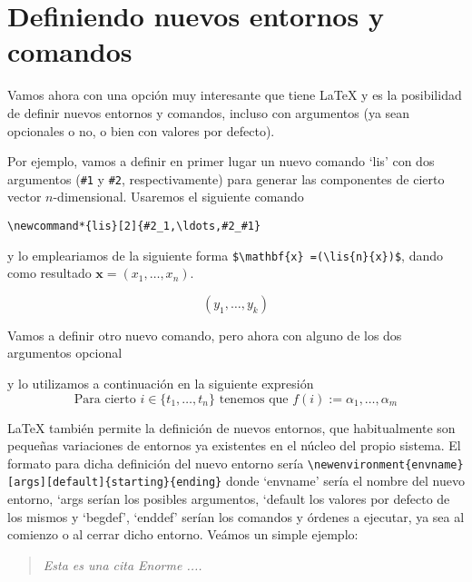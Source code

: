 \documentclass[11pt]{article}
\begin{document}
\section{Definiendo nuevos entornos y comandos}

Vamos ahora con una opción muy interesante que tiene {\LaTeX} y es la posibilidad de definir nuevos  entornos y comandos, incluso con argumentos (ya sean opcionales o no, o bien con valores por defecto).

Por ejemplo, vamos a definir en primer lugar un nuevo comando `lis' con dos argumentos (\verb|#1| y \verb|#2|, respectivamente) para generar las componentes de cierto vector $n$-dimensional. Usaremos el siguiente comando

\verb|\newcommand*{lis}[2]{#2_1,\ldots,#2_#1}| 
\newcommand{\lis}[2]{#2_1,\ldots,#2_#1}

\noindent y lo empleariamos de la siguiente forma  \verb|$\mathbf{x} =(\lis{n}{x})$|, dando como resultado 
$\mathbf{x} = (\lis{n}{x})$.

$$(\lis{k}{y})$$

Vamos a definir otro nuevo comando, pero ahora con alguno de los dos argumentos opcional

\newcommand{\seq}[2][n]{#2_1,\ldots,#2_#1}

y lo utilizamos a continuación en la siguiente expresión 
$$
\mbox{Para cierto  } i\in \{ \seq{t}  \}  
\text{ tenemos que  } f(i):= \seq[m]{\alpha} 
$$ 

{\LaTeX} también permite la definición de nuevos entornos, que habitualmente son pequeñas variaciones de entornos ya existentes en el núcleo del propio sistema. El formato para dicha definición del nuevo entorno sería
\verb|\newenvironment{envname}[args][default]{starting}{ending}| donde 
`envname' sería el nombre del nuevo entorno, `args serían los posibles argumentos, `default los valores por defecto de los mismos y `begdef',  `enddef' serían los comandos y órdenes a ejecutar, ya sea al comienzo o al cerrar dicho entorno. Veámos un simple ejemplo:

\begin{Example}[gobble=0]
\newenvironment{Hugeitquote}%
{\begin{quote}\begin{Huge}\it}%
{\end{Huge}\end{quote}}

\begin{Hugeitquote}
	Esta es una cita Enorme ....
\end{Hugeitquote}
\end{Example}
\end{document}
